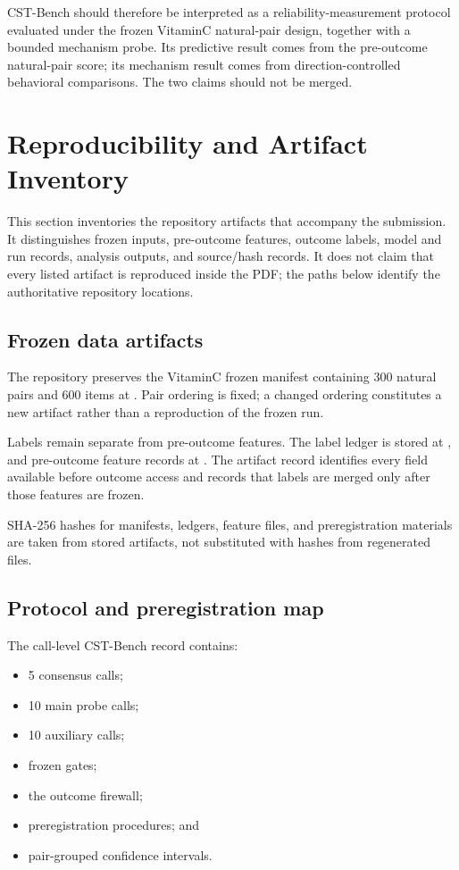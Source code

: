 \documentclass[11pt]{article}
\begin{document}
CST-Bench should therefore be interpreted as a reliability-measurement protocol evaluated under the frozen VitaminC natural-pair design, together with a bounded mechanism probe. Its predictive result comes from the pre-outcome natural-pair score; its mechanism result comes from direction-controlled behavioral comparisons. The two claims should not be merged.

\section{Reproducibility and Artifact Inventory}

This section inventories the repository artifacts that accompany the submission. It distinguishes frozen inputs, pre-outcome features, outcome labels, model and run records, analysis outputs, and source/hash records. It does not claim that every listed artifact is reproduced inside the PDF; the paths below identify the authoritative repository locations.

\subsection{Frozen data artifacts}

The repository preserves the VitaminC frozen manifest containing 300 natural pairs and 600 items at . Pair ordering is fixed; a changed ordering constitutes a new artifact rather than a reproduction of the frozen run.

Labels remain separate from pre-outcome features. The label ledger is stored at , and pre-outcome feature records at . The artifact record identifies every field available before outcome access and records that labels are merged only after those features are frozen.

SHA-256 hashes for manifests, ledgers, feature files, and preregistration materials are taken from stored artifacts, not substituted with hashes from regenerated files.

\subsection{Protocol and preregistration map}

The call-level CST-Bench record contains:

\begin{itemize}
  \item 5 consensus calls;
  \item 10 main probe calls;
  \item 10 auxiliary calls;
  \item frozen gates;
  \item the outcome firewall;
  \item preregistration procedures; and
  \item pair-grouped confidence intervals.
\end{itemize}
\end{document}
